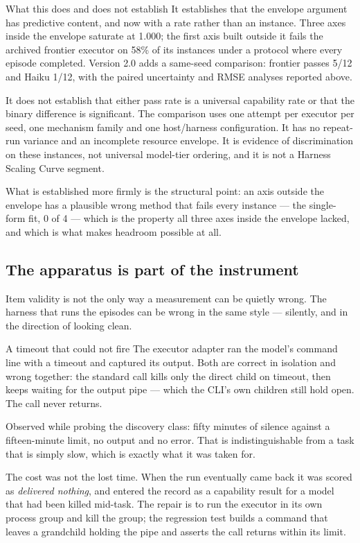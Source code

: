\documentclass[11pt]{article}
\theoremstyle{definition}
\begin{document}
\begin{claimbox}{What this does and does not establish}
It establishes that the envelope argument has predictive content, and now with a rate rather than an instance. Three axes inside the envelope saturate at 1.000; the first axis built outside it fails the archived frontier executor on 58\% of its instances under a protocol where every episode completed. Version 2.0 adds a same-seed comparison: frontier passes 5/12 and Haiku 1/12, with the paired uncertainty and RMSE analyses reported above.

It does not establish that either pass rate is a universal capability rate or that the binary difference is significant. The comparison uses one attempt per executor per seed, one mechanism family and one host/harness configuration. It has no repeat-run variance and an incomplete resource envelope. It is evidence of discrimination on these instances, not universal model-tier ordering, and it is not a Harness Scaling Curve segment.
\end{claimbox}

What is established more firmly is the structural point: an axis outside the envelope has a plausible wrong method that fails every instance --- the single-form fit, 0 of 4 --- which is the property all three axes inside the envelope lacked, and which is what makes headroom possible at all.

\subsection{The apparatus is part of the instrument}\label{sec:apparatus}

Item validity is not the only way a measurement can be quietly wrong. The harness that runs the episodes can be wrong in the same style --- silently, and in the direction of looking clean.

\begin{cautionbox}{A timeout that could not fire}
The executor adapter ran the model's command line with a timeout and captured its output. Both are correct in isolation and wrong together: the standard call kills only the direct child on timeout, then keeps waiting for the output pipe --- which the CLI's own children still hold open. The call never returns.

Observed while probing the discovery class: fifty minutes of silence against a fifteen-minute limit, no output and no error. That is indistinguishable from a task that is simply slow, which is exactly what it was taken for.

The cost was not the lost time. When the run eventually came back it was scored as \emph{delivered nothing}, and entered the record as a capability result for a model that had been killed mid-task. The repair is to run the executor in its own process group and kill the group; the regression test builds a command that leaves a grandchild holding the pipe and asserts the call returns within its limit.
\end{cautionbox}
\end{document}
